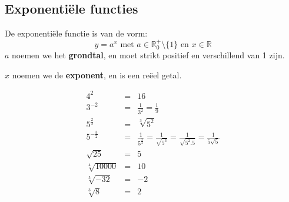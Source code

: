 

\subsection{Exponenti\"ele functies}


\begin{definitie}
De exponenti\"ele functie is van de vorm:
\begin{equation*}
	y=a^{x}\text{ met }a\in\mathbb{R}_{0}^{+}\setminus\{ 1\}\text{ en }x\in\mathbb{R}
\end{equation*}
$a$ noemen we het \textbf{grondtal}, en moet strikt positief
en verschillend van 1 zijn.

$x$ noemen we de \textbf{exponent}, en is een re\"eel getal.
\end{definitie}

\begin{voorbeeld}
\begin{eqnarray*}
4^{2}&=&16 \\
3^{-2}&=&\frac{1}{3^{2}}=\frac{1}{9} \\
5^{\frac{2}{3}}&=&\sqrt[3]{5^{2}} \\
5^{-\frac{3}{2}}&=&\frac{1}{5^{\frac{3}{2}}}=\frac{1}{\sqrt{5^{3}}}=\frac{1}{\sqrt{5^{2}.5}}=\frac{1}{5\sqrt{5}}\\
\sqrt{25}&=&5 \\
\sqrt[4]{10000}&=&10\\
\sqrt[5]{-32}&=&-2\\
\sqrt[3]{8}&=&2\\
\end{eqnarray*}
\end{voorbeeld}

